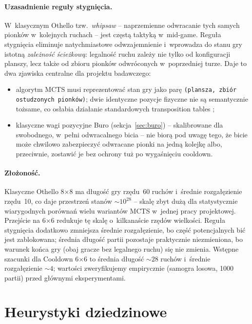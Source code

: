\documentclass[11pt,a4paper]{article}
\begin{document}
\paragraph{Uzasadnienie reguły stygnięcia.} W~klasycznym Othello tzw.\ \emph{whipsaw} -- naprzemienne odwracanie tych samych pionków w~kolejnych ruchach -- jest częstą taktyką w~mid-game. Reguła stygnięcia eliminuje natychmiastowe odwzajemnienie i~wprowadza do stanu gry istotną \emph{zależność ścieżkową}: legalność ruchu zależy nie tylko od konfiguracji planszy, lecz także od zbioru pionków odwróconych w~poprzedniej turze. Daje to dwa zjawiska centralne dla projektu badawczego:
\begin{itemize}[leftmargin=1.5em,itemsep=2pt]
    \item algorytm MCTS musi reprezentować stan gry jako parę \texttt{(plansza, zbiór ostudzonych pionków)}; dwie identyczne pozycje fizyczne nie są semantycznie tożsame, co osłabia działanie standardowych transposition tables \cite{childs2008transpositions};
    \item klasyczne wagi pozycyjne Buro (sekcja~\ref{sec:buro}) -- skalibrowane dla swobodnego, w~pełni odwracalnego bicia -- nie biorą pod uwagę tego, że bicie może chwilowo zabezpieczyć odwracane pionki na jedną kolejkę albo, przeciwnie, zostawić je bez ochrony tuż po wygaśnięciu cooldown.
\end{itemize}

\paragraph{Złożoność.} Klasyczne Othello 8$\times$8 ma długość gry rzędu~60 ruchów i~średnie rozgałęzienie rzędu~10, co daje przestrzeń stanów $\sim\!10^{28}$ -- skalę zbyt dużą dla statystycznie wiarygodnych porównań wielu wariantów MCTS w~jednej pracy projektowej. Przejście na 6$\times$6 redukuje tę skalę o~kilkanaście rzędów wielkości. Reguła stygnięcia dodatkowo zmniejsza średnie rozgałęzienie, bo część potencjalnych bić jest zablokowana; średnia długość partii pozostaje praktycznie niezmieniona, bo warunek końca gry (obaj gracze bez legalnego ruchu) się nie zmienia. Wstępne szacunki dla Cooldown 6$\times$6 to średnia długość $\sim\!28$ ruchów i~średnie rozgałęzienie $\sim\!4$; wartości zweryfikujemy empirycznie (samogra losowa, 1000 partii) przed głównymi eksperymentami.

\section{Heurystyki dziedzinowe}\label{sec:heuristics}
\end{document}
